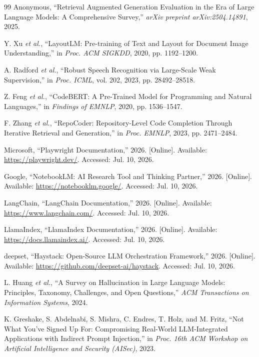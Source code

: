 \documentclass[conference]{IEEEtran}
\begin{document}
\begin{thebibliography}{99}
 Anonymous, ``Retrieval Augmented Generation Evaluation in the Era of Large Language Models: A Comprehensive Survey,'' \emph{arXiv preprint arXiv:2504.14891}, 2025.

 Y. Xu \emph{et al.}, ``LayoutLM: Pre-training of Text and Layout for Document Image Understanding,'' in \emph{Proc. ACM SIGKDD}, 2020, pp. 1192--1200.

 A. Radford \emph{et al.}, ``Robust Speech Recognition via Large-Scale Weak Supervision,'' in \emph{Proc. ICML}, vol. 202, 2023, pp. 28492--28518.

 Z. Feng \emph{et al.}, ``CodeBERT: A Pre-Trained Model for Programming and Natural Languages,'' in \emph{Findings of EMNLP}, 2020, pp. 1536--1547.

 F. Zhang \emph{et al.}, ``RepoCoder: Repository-Level Code Completion Through Iterative Retrieval and Generation,'' in \emph{Proc. EMNLP}, 2023, pp. 2471--2484.

 Microsoft, ``Playwright Documentation,'' 2026. [Online]. Available: \url{https://playwright.dev/}. Accessed: Jul. 10, 2026.

 Google, ``NotebookLM: AI Research Tool and Thinking Partner,'' 2026. [Online]. Available: \url{https://notebooklm.google/}. Accessed: Jul. 10, 2026.

 LangChain, ``LangChain Documentation,'' 2026. [Online]. Available: \url{https://www.langchain.com/}. Accessed: Jul. 10, 2026.

 LlamaIndex, ``LlamaIndex Documentation,'' 2026. [Online]. Available: \url{https://docs.llamaindex.ai/}. Accessed: Jul. 10, 2026.

 deepset, ``Haystack: Open-Source LLM Orchestration Framework,'' 2026. [Online]. Available: \url{https://github.com/deepset-ai/haystack}. Accessed: Jul. 10, 2026.

 L. Huang \emph{et al.}, ``A Survey on Hallucination in Large Language Models: Principles, Taxonomy, Challenges, and Open Questions,'' \emph{ACM Transactions on Information Systems}, 2024.

 K. Greshake, S. Abdelnabi, S. Mishra, C. Endres, T. Holz, and M. Fritz, ``Not What You've Signed Up For: Compromising Real-World LLM-Integrated Applications with Indirect Prompt Injection,'' in \emph{Proc. 16th ACM Workshop on Artificial Intelligence and Security (AISec)}, 2023.


\end{thebibliography}
\end{document}
